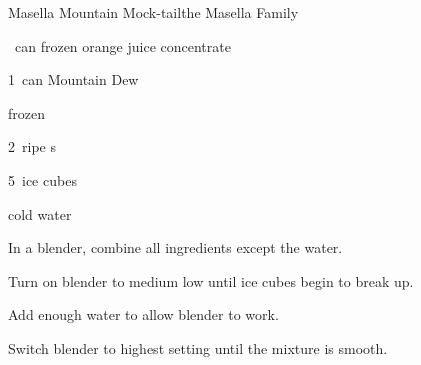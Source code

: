 \begin{recipe}{Masella Mountain Mock-tail}{the Masella Family}{}

\begin{ingredients}
\item \half~can frozen orange juice concentrate
\item 1~can Mountain Dew
\item \C{\half} frozen 
\item 2~ripe s
\item 5~ice cubes
\item cold water
\end{ingredients}

\begin{directions}
\item In a blender, combine all ingredients except the water.
\item Turn on blender to medium low until ice cubes begin to break up.
\item Add enough water to allow blender to work.
\item Switch blender to highest setting until the mixture is smooth.
\end{directions}

\end{recipe}
